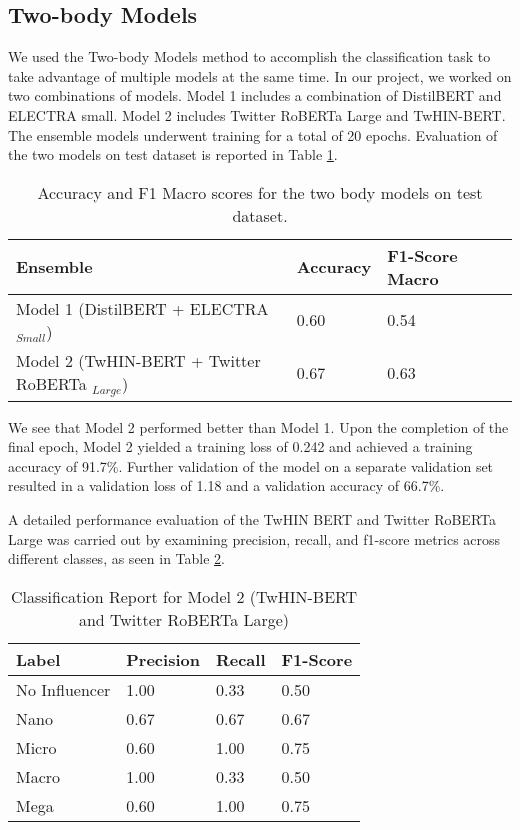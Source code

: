 \documentclass[]{ceurart}
\begin{document}
\subsection{Two-body Models}

We used the Two-body Models method to accomplish the classification task to take advantage of multiple models at the same time. In our project, we worked on two combinations of models. Model 1 includes a combination of DistilBERT and ELECTRA small. Model 2 includes Twitter RoBERTa Large and TwHIN-BERT. The ensemble models underwent training for a total of 20 epochs. Evaluation of the two models on test dataset is reported in Table \ref{table:3}.\\

\begin{table}[ht]
\caption{Accuracy and F1 Macro scores for the two body models on test dataset.} 
\centering
\begin{tabular}{llll}
\hline
\textbf{Ensemble} & \textbf{Accuracy} & \textbf{F1-Score Macro}\\
\hline
{Model 1 (DistilBERT + ELECTRA $_{Small}$)} & {0.60} & {0.54}\\
{Model 2 (TwHIN-BERT + Twitter RoBERTa $_{Large}$)} & {0.67} & {0.63}\\
\hline
\end{tabular}
\label{table:3}
\end{table}

We see that Model 2 performed better than Model 1. Upon the completion of the final epoch, Model 2 yielded a training loss of 0.242 and achieved a training accuracy of 91.7\%. Further validation of the model on a separate validation set resulted in a validation loss of 1.18 and a validation accuracy of 66.7\%.

A detailed performance evaluation of the TwHIN BERT and Twitter RoBERTa Large was carried out by examining precision, recall, and f1-score metrics across different classes, as seen in Table \ref{table:4}.

\begin{table}[ht]
\caption{Classification Report for Model 2 (TwHIN-BERT and Twitter RoBERTa Large)}
\centering
\begin{tabular}{llll}
\hline
\textbf{Label} & \textbf{Precision} & \textbf{Recall} & \textbf{F1-Score}\\
\hline
{No Influencer} & {1.00} & {0.33} & {0.50}\\
{Nano}& {0.67} & {0.67} & {0.67}\\
{Micro} & {0.60} & {1.00} & {0.75}\\
{Macro} & {1.00} & {0.33} & {0.50}\\
{Mega} & {0.60} & {1.00} & {0.75}\\
\hline
\end{tabular}
\label{table:4}
\end{table}
\end{document}
